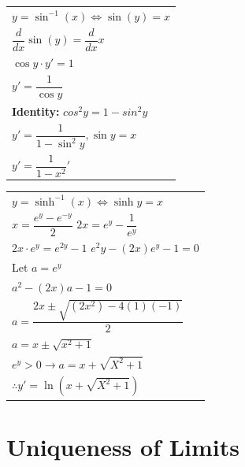 \documentclass{article}
\begin{document}
\begin{minipage}{0.45\linewidth}
\begin{tabular}{l}
$y = \sin^{-1}(x) \Longleftrightarrow \sin(y) = x$\\
$\dfrac{d}{dx} \sin(y) = \dfrac{d}{dx} x$\\
$\cos y \cdot y' = 1$\\
$y' = \dfrac{1}{\cos y}$\\
\textbf{Identity:} $cos^2 y = 1 - sin^2 y$\\
$y' = \dfrac{1}{1 - \sin^2 y} , \sin y = x$\\
$y' = \dfrac{1}{1 - x^2}'$
\end{tabular}
\end{minipage}
\begin{minipage}{0.5\linewidth}
\begin{tabular}{l}
$y = \sinh^{-1} (x) \Longleftrightarrow \sinh y = x$\\
$x = \dfrac{e^y - e^{-y}}{2}$ \hspace {0.5cm} $2x = e^y - \dfrac{1}{e^y}$\\
$2x \cdot e^y = e^{2y} - 1$ \hspace{0.5cm} $e^2y - (2x)e^y - 1= 0$\\
Let $a = e^y$\\
$a^2 - (2x)a - 1 = 0$\\
$a = \dfrac{2x \pm \sqrt{(2x^2) - 4(1)(-1)}}{2}$\\
$a = x \pm \sqrt{x^2 + 1}$\\
$e^y > 0 \rightarrow a = x + \sqrt{X^2 + 1}$\\
$\therefore y' = \ln(x + \sqrt{X^2 + 1})$
\end{tabular}
\end{minipage}

\section{Uniqueness of Limits}
\end{document}
